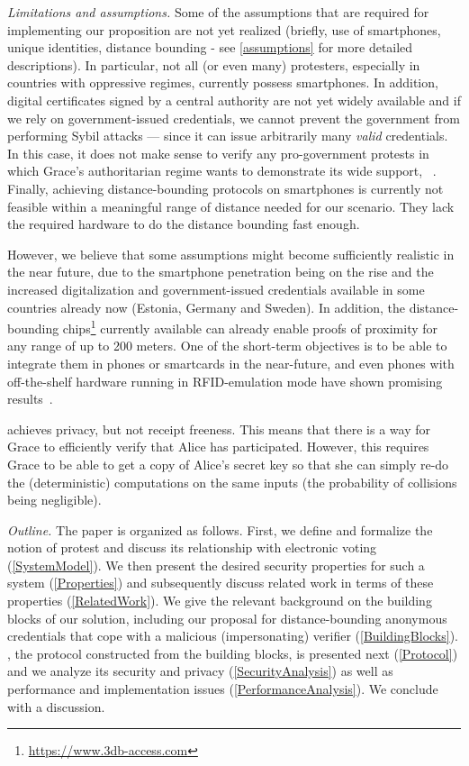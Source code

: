 \emph{Limitations and assumptions.} Some of the assumptions that are required 
for implementing our proposition are not yet realized (briefly, use of smartphones, unique identities, distance bounding - see \cref{assumptions} 
for more detailed descriptions). In particular, not all (or even many) 
protesters, especially in countries with oppressive regimes, currently possess 
smartphones.
In addition, digital certificates signed by a central authority are not yet 
widely available and if we rely on government-issued credentials, we cannot 
prevent the government from performing Sybil attacks --- since it can issue 
arbitrarily many \emph{valid} credentials.
In this case, it does not make sense to verify any pro-government protests in 
which Grace's authoritarian regime wants to demonstrate its wide support, 
\eg~\cite{AlJazeeraOnVenezuela2017,VenezuelanStateWorkersCalledToParticipate}.
Finally, achieving distance-bounding protocols on smartphones is currently not 
feasible within a meaningful range of distance needed for our scenario.
They lack the required hardware to do the distance bounding fast enough.

However, we believe that some assumptions might become sufficiently realistic in 
the near future, due to the smartphone penetration being on the rise and the 
increased digitalization and government-issued credentials available in some 
countries already now (\eg Estonia, Germany and Sweden).
In addition, the distance-bounding 
chips\footnote{\url{https://www.3db-access.com}} currently available can already 
enable proofs of proximity for any range of up to 200 meters.
One of the short-term objectives is to be able to integrate them in phones or smartcards in the near-future, and even phones with off-the-shelf hardware running in RFID-emulation mode have shown promising results~\cite{DBonSmartphones}.

\PRIVO achieves privacy, but not receipt freeness.
This means that there is a way for Grace to efficiently verify that Alice has 
participated.
However, this requires Grace to be able to get a copy of Alice's secret key so that she can simply re-do the (deterministic) computations on the same inputs (the probability of collisions being negligible).

\emph{Outline.} The paper is organized as follows. First, we define and 
formalize the notion of protest and discuss its relationship with electronic 
voting (\cref{SystemModel}).  We then present the desired security properties 
for such a system (\cref{Properties}) and subsequently discuss related work in 
terms of these properties (\cref{RelatedWork}). We give the relevant background 
on the building blocks of our solution, including our proposal for 
distance-bounding anonymous credentials that cope with a malicious 
(impersonating) verifier (\cref{BuildingBlocks}). \PRIVO, the protocol 
constructed from the building blocks, is presented next (\cref{Protocol}) and 
we analyze its security and privacy (\cref{SecurityAnalysis}) as well as 
performance and implementation issues (\cref{PerformanceAnalysis}). We conclude 
with a discussion.
